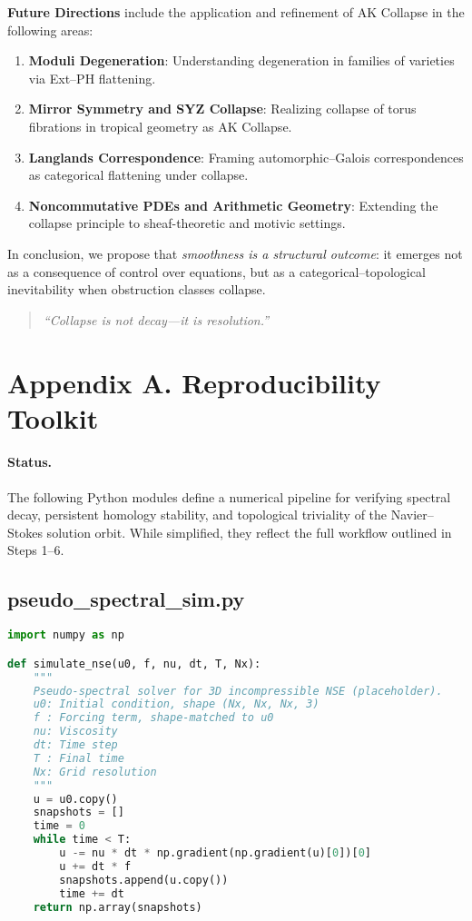 \documentclass[11pt]{article}
\theoremstyle{definition}
\begin{document}
\noindent
\textbf{Future Directions} include the application and refinement of AK Collapse in the following areas:
\begin{enumerate}
    \item \textbf{Moduli Degeneration}: Understanding degeneration in families of varieties via Ext–PH flattening.
    \item \textbf{Mirror Symmetry and SYZ Collapse}: Realizing collapse of torus fibrations in tropical geometry as AK Collapse.
    \item \textbf{Langlands Correspondence}: Framing automorphic–Galois correspondences as categorical flattening under collapse.
    \item \textbf{Noncommutative PDEs and Arithmetic Geometry}: Extending the collapse principle to sheaf-theoretic and motivic settings.
\end{enumerate}

\medskip

\noindent
In conclusion, we propose that \emph{smoothness is a structural outcome}:  
it emerges not as a consequence of control over equations, but as a categorical–topological inevitability when obstruction classes collapse.

\begin{quote}
\textit{“Collapse is not decay—it is resolution.”}
\end{quote}



\section{Appendix A. Reproducibility Toolkit}
\label{sec:appendixA}

\paragraph{Status.}
The following Python modules define a numerical pipeline for verifying spectral decay, persistent homology stability, and topological triviality of the Navier--Stokes solution orbit. While simplified, they reflect the full workflow outlined in Steps 1–6.

\subsection*{pseudo\_spectral\_sim.py}
\begin{lstlisting}[language=Python]
import numpy as np

def simulate_nse(u0, f, nu, dt, T, Nx):
    """
    Pseudo-spectral solver for 3D incompressible NSE (placeholder).
    u0: Initial condition, shape (Nx, Nx, Nx, 3)
    f : Forcing term, shape-matched to u0
    nu: Viscosity
    dt: Time step
    T : Final time
    Nx: Grid resolution
    """
    u = u0.copy()
    snapshots = []
    time = 0
    while time < T:
        u -= nu * dt * np.gradient(np.gradient(u)[0])[0]
        u += dt * f
        snapshots.append(u.copy())
        time += dt
    return np.array(snapshots)
\end{lstlisting}
\end{document}
